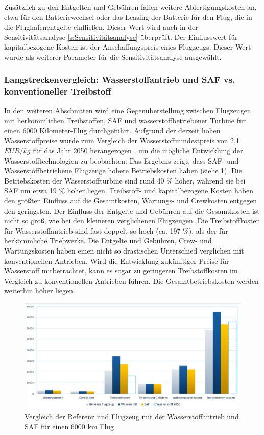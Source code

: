 Zusätzlich zu den Entgelten und Gebühren fallen weitere Abfertigungskosten an,
etwa für den Batteriewechsel oder das Leasing der Batterie für den Flug,
die in die Flughafenentgelte einfließen.
Dieser Wert wird auch in der Sensitivitätsanalyse \ref{s:Sensitivitätsanalyse} überprüft. 
Der Einflusswert für kapitalbezogene Kosten ist der Anschaffungspreis eines Flugzeugs. 
Dieser Wert wurde als weiterer Parameter für die Sensitivitätsanalyse ausgewählt.\\

\subsubsection{Langstreckenvergleich: Wasserstoffantrieb und SAF vs. konventioneller Treibstoff}
In den weiteren Abschnitten wird eine Gegenüberstellung zwischen Flugzeugen mit herkömmlichen Treibstoffen, 
SAF und wasserstoffbetriebener Turbine für einen 6000 Kilometer-Flug durchgeführt. %
Aufgrund der derzeit hohen Wasserstoffpreise wurde zum Vergleich der Wasserstoffmindestpreis 
von 2,1 $EUR/kg$ für das Jahr 2050 herangezogen \cite{hoelzen2022hydrogen}, 
um die mögliche Entwicklung der Wasserstofftechnologien zu beobachten.
%
Das Ergebnis zeigt, dass SAF- und Wasserstoffbetriebene Flugzeuge höhere Betriebskosten haben (siehe \ref{vergleichWA_Ref}).
Die Betriebskosten der Wasserstoffturbine sind rund 40 \% höher, während sie bei SAF um etwa 19 \% höher liegen.
Treibstoff- und kapitalbezogene Kosten haben den größten Einfluss auf die Gesamtkosten, 
Wartungs- und Crewkosten entgegen den geringsten.
Der Einfluss der Entgelte und Gebühren auf die Gesamtkosten ist nicht so groß, 
wie bei den kleineren verglichenen Flugzeugen.
Die Treibstoffkosten für Wasserstoffantrieb sind fast doppelt so hoch (ca. 197 \%), als der für herkömmliche Triebwerke. 
Die Entgelte und Gebühren, Crew- und Wartungskosten haben einen nicht so 
drastischen Unterschied verglichen mit konventionellen Antrieben. 
%
Wird die Entwicklung zukünftiger Preise für Wasserstoff mitbetrachtet, 
kann es sogar zu geringeren Treibstoffkosten im Vergleich zu konventionellen Antrieben führen. 
Die Gesamtbetriebskosten werden weiterhin höher liegen.

\begin{figure}[h]
	\centering
	\includegraphics[width=0.9\linewidth]{Bilder/VergleichWA_SAF.png}
	\caption[Betriebskosten]{Vergleich der Referenz und Flugzeug mit der Wasserstoffantrieb und SAF für einen 6000 km Flug}
	\label{vergleichWA_Ref}
\end{figure}

